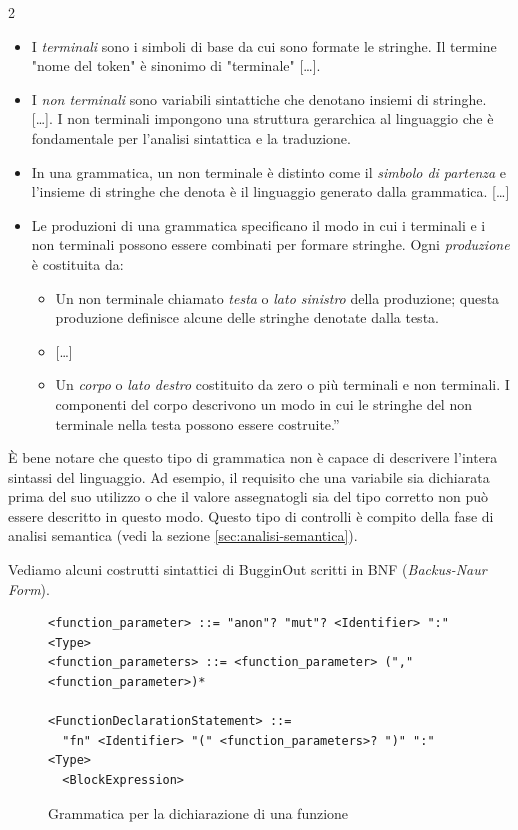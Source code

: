 \begin{parcolumns}[colwidths={1=0.44\textwidth,2=0.44\textwidth},rulebetween=true,nofirstindent=true,sloppy=true]{2}
{		\begin{itemize}
			\item I \emph{terminali} sono i simboli di base da cui sono formate le stringhe. Il termine "nome del token" \`e sinonimo di "terminale" [\ldots].
			\item I \emph{non terminali} sono variabili sintattiche che denotano insiemi di stringhe. [\ldots]. I non terminali impongono una struttura gerarchica al linguaggio che \`e fondamentale per l'analisi sintattica e la traduzione.
			\item In una grammatica, un non terminale \`e distinto come il \emph{simbolo di partenza} e l'insieme di stringhe che denota \`e il linguaggio generato dalla grammatica. [\ldots]
			\item Le produzioni di una grammatica specificano il modo in cui i terminali e i non terminali possono essere combinati per formare stringhe. Ogni \emph{produzione} \`e costituita da:
			\begin{itemize}
				\item Un non terminale chiamato \emph{testa} o \emph{lato sinistro} della produzione; questa produzione definisce alcune delle stringhe denotate dalla testa.
				\item{} [\ldots]
				\item Un \emph{corpo} o \emph{lato destro} costituito da zero o pi\`u terminali e non terminali. I componenti del corpo descrivono un modo in cui le stringhe del non terminale nella testa possono essere costruite.''
			\end{itemize}
		\end{itemize}
	}
	\colplacechunks
\end{parcolumns}

\`E bene notare che questo tipo di grammatica non \`e capace di descrivere l'intera sintassi del linguaggio. Ad esempio, il requisito che una variabile sia dichiarata prima del suo utilizzo o che il valore assegnatogli sia del tipo corretto non pu\`o essere descritto in questo modo. Questo tipo di controlli \`e compito della fase di analisi semantica (vedi la sezione \ref{sec:analisi-semantica}).

Vediamo alcuni costrutti sintattici di BugginOut scritti in BNF (\textit{Backus-Naur Form}).

\begin{figure}[H]
	\centering
	\begin{verbatim}
<function_parameter> ::= "anon"? "mut"? <Identifier> ":" <Type>
<function_parameters> ::= <function_parameter> ("," <function_parameter>)*

<FunctionDeclarationStatement> ::=
  "fn" <Identifier> "(" <function_parameters>? ")" ":" <Type>
  <BlockExpression>
  \end{verbatim}
	\label{fig:bugginout-function-declaration}
	\caption{Grammatica per la dichiarazione di una funzione}
\end{figure}

